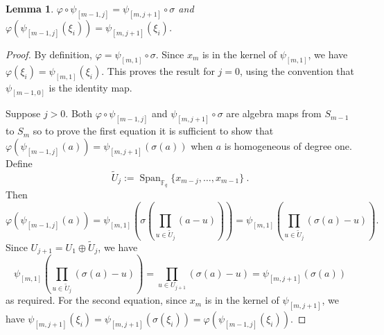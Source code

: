 \documentclass{amsart}
\newcommand{\field}{\mathbb{F}}
\newtheorem{lem}[subsection]{Lemma}
\DeclareMathOperator{\Span}{Span}
\begin{document}
\begin{lem} \label{monomorphism_lem} 
$\varphi\circ\psi_{[m-1,j]}=\psi_{[m,j+1]}\circ\sigma$ and 
$\varphi(\psi_{[m-1,j]}(\xi_i))=\psi_{[m,j+1]}(\xi_i)$.
\end{lem}
\begin{proof} By definition, $\varphi=\psi_{[m,1]}\circ \sigma$.
Since $x_m$ is in the kernel of $\psi_{[m,1]}$,
we have $\varphi(\xi_i)=\psi_{[m,1]}(\xi_i)$. 
This proves the result for $j=0$, using the convention that $\psi_{[m-1,0]}$
is the identity map.

Suppose $j>0$. Both $\varphi\circ\psi_{[m-1,j]}$ and 
$\psi_{[m,j+1]}\circ\sigma$ are algebra maps from $S_{m-1}$ to $S_m$
so to prove the first equation it is sufficient to show that 
$\varphi(\psi_{[m-1,j]}(a))=\psi_{[m,j+1]}(\sigma(a))$ when 
$a$ is homogeneous of degree one.
Define 
$$\widetilde{U}_j:=\Span_{\field_q}\{x_{m-j},\ldots,x_{m-1} \}\ .$$
Then
$$\varphi(\psi_{[m-1,j]}(a))
=\psi_{[m,1]}\left(\sigma\left(\prod_{u\in \widetilde{U}_j}(a-u)\right)\right)
=\psi_{[m,1]}\left(\prod_{u\in \widetilde{U}_j}(\sigma(a)-u)\right).$$
Since $U_{j+1}=U_1\oplus \widetilde{U}_j$,
we have 
$$\psi_{[m,1]}\left(\prod_{u\in \widetilde{U}_j}(\sigma(a)-u)\right)
=\prod_{u\in U_{j+1}}(\sigma(a)-u)=\psi_{[m,j+1]}(\sigma(a))$$
as required. For the second equation, since $x_m$ is in the kernel of $\psi_{[m,j+1]}$, we have 
$\psi_{[m,j+1]}(\xi_i)=\psi_{[m,j+1]}(\sigma(\xi_i))
=\varphi(\psi_{[m-1,j]}(\xi_i))$. 
\end{proof}
\end{document}
